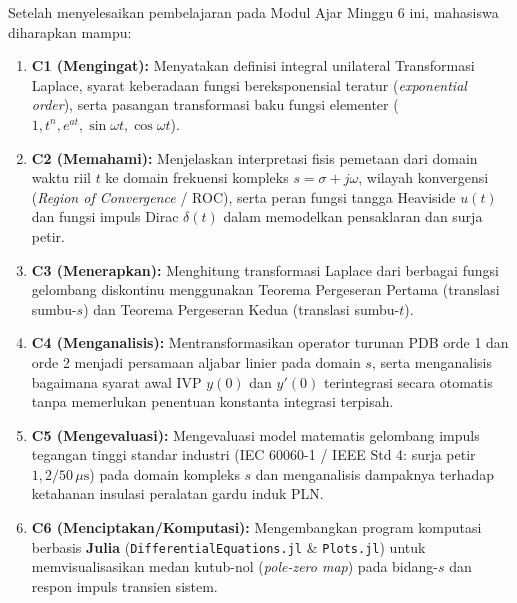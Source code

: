 \documentclass[11pt,a4paper]{article}
\theoremstyle{definition}
\begin{document}
\begin{tcolorbox}[colback=blue!5!white,colframe=headercolor,title=\textbf{Capaian Pembelajaran Khusus (Sub-CPMK 4)}]
Setelah menyelesaikan pembelajaran pada Modul Ajar Minggu 6 ini, mahasiswa diharapkan mampu:
\begin{enumerate}[leftmargin=*]
    \item \textbf{C1 (Mengingat):} Menyatakan definisi integral unilateral Transformasi Laplace, syarat keberadaan fungsi bereksponensial teratur (\textit{exponential order}), serta pasangan transformasi baku fungsi elementer ($1, t^n, e^{at}, \sin\omega t, \cos\omega t$).
    \item \textbf{C2 (Memahami):} Menjelaskan interpretasi fisis pemetaan dari domain waktu riil $t$ ke domain frekuensi kompleks $s = \sigma + j\omega$, wilayah konvergensi (\textit{Region of Convergence} / ROC), serta peran fungsi tangga Heaviside $u(t)$ dan fungsi impuls Dirac $\delta(t)$ dalam memodelkan pensaklaran dan surja petir.
    \item \textbf{C3 (Menerapkan):} Menghitung transformasi Laplace dari berbagai fungsi gelombang diskontinu menggunakan Teorema Pergeseran Pertama (translasi sumbu-$s$) dan Teorema Pergeseran Kedua (translasi sumbu-$t$).
    \item \textbf{C4 (Menganalisis):} Mentransformasikan operator turunan PDB orde 1 dan orde 2 menjadi persamaan aljabar linier pada domain $s$, serta menganalisis bagaimana syarat awal IVP $y(0)$ dan $y'(0)$ terintegrasi secara otomatis tanpa memerlukan penentuan konstanta integrasi terpisah.
    \item \textbf{C5 (Mengevaluasi):} Mengevaluasi model matematis gelombang impuls tegangan tinggi standar industri (IEC 60060-1 / IEEE Std 4: surja petir $1{,}2/50\,\mu\text{s}$) pada domain kompleks $s$ dan menganalisis dampaknya terhadap ketahanan insulasi peralatan gardu induk PLN.
    \item \textbf{C6 (Menciptakan/Komputasi):} Mengembangkan program komputasi berbasis \textbf{Julia} (\texttt{DifferentialEquations.jl} \& \texttt{Plots.jl}) untuk memvisualisasikan medan kutub-nol (\textit{pole-zero map}) pada bidang-$s$ dan respon impuls transien sistem.
\end{enumerate}
\end{tcolorbox}

\vspace{0.3cm}
\tableofcontents
\vspace{0.5cm}

\newpage
\end{document}
